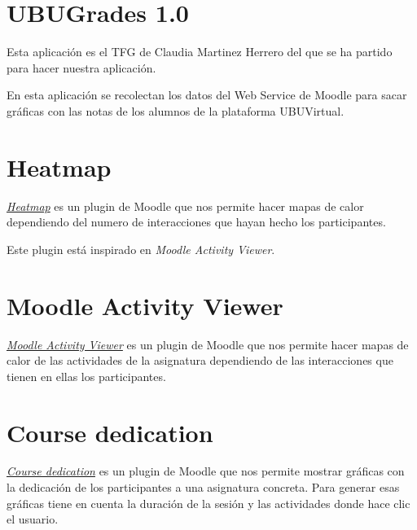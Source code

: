 
\section{UBUGrades 1.0}\label{ubugrades--10}

Esta aplicación es el TFG de Claudia Martinez Herrero \cite{claudia} del que se ha partido para hacer nuestra aplicación.

En esta aplicación se recolectan los datos del Web Service de Moodle para sacar gráficas con las notas de los alumnos de la plataforma UBUVirtual.

\section{Heatmap}\label{heatmap}

\href{https://moodle.org/plugins/block_heatmap}{\emph{Heatmap}} es un plugin de Moodle que nos permite hacer mapas de calor dependiendo del numero de interacciones que hayan hecho los participantes.

Este plugin está inspirado en \emph{Moodle Activity Viewer}.

\section{ Moodle Activity Viewer}\label{moodle-activity-viewer}

\href{https://damos.world/2013/08/30/the-moodle-activity-viewer-mav-heatmaps-of-student-activity/}{ \emph{Moodle Activity Viewer}} es un plugin de Moodle que nos permite hacer mapas de calor de las actividades de la asignatura dependiendo de las interacciones que tienen en ellas los participantes.


\section{Course dedication}\label{course-dedication}

\href{https://moodle.org/plugins/block_dedication}{\emph{Course dedication}} es un plugin de Moodle que nos permite mostrar gráficas con la dedicación de los participantes a una asignatura concreta. Para generar esas gráficas tiene en cuenta la duración de la sesión y las actividades donde hace clic el usuario.
